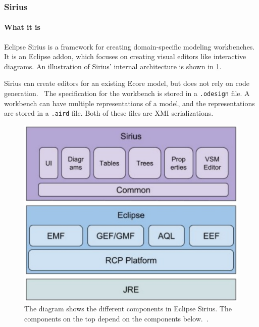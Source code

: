 
\subsubsection{Sirius}\label{sec:sirius}
\paragraph*{What it is} Eclipse Sirius is a framework for creating  domain-specific modeling workbenches.~\cite{eclipsefoundationSiriusEasiestWay}
It is an \gls{Eclipse} addon, which focuses on creating visual editors like interactive diagrams.
An illustration of Sirius' internal architecture is shown in \cref{fig:sirius-architecture}.

Sirius can create editors for an existing \gls{Ecore} model, but does not rely on code generation.~\cite{eclipsefoundationSiriusEasiestWay}
The specification for the workbench is stored in a \texttt{.odesign} file.
A workbench can have multiple representations of a model, and the representations are stored in a \texttt{.aird} file.
Both of these files are \acrshort{XMI} serializations.

\begin{figure}[htbp]  %
  \centering
  \includegraphics[width=\textwidth]{figures/Sirius_architecture}
  \caption[The Sirius Architecture]{The diagram shows the different components in Eclipse Sirius. The components on the top depend on the components below.~\cite[p.~36]{davidSiriusCon2018Sirius2018}.}\label{fig:sirius-architecture}
\end{figure}


